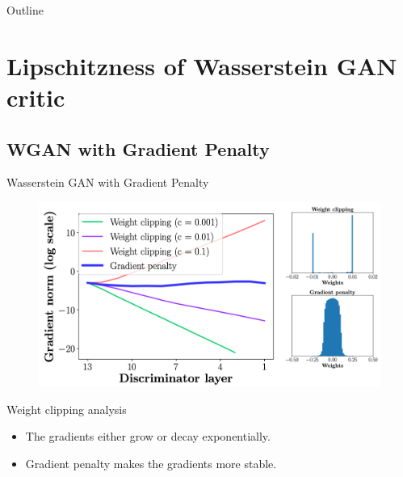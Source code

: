 \begin{frame}{Outline}
	\tableofcontents
\end{frame}
\section{Lipschitzness of Wasserstein GAN critic}
\subsection{WGAN with Gradient Penalty}
\begin{frame}{Wasserstein GAN with Gradient Penalty}
	\vspace{-0.2cm}
	\begin{figure}
		\centering
		\includegraphics[width=0.9\linewidth]{figs/wgan_gp_weights}
	\end{figure}
	\vspace{-0.2cm} 
	
	\begin{block}{Weight clipping analysis}
		\begin{itemize}
			\item The gradients either grow or decay exponentially.
			\item Gradient penalty makes the gradients more stable.
		\end{itemize}
	\end{block}
\end{frame}
